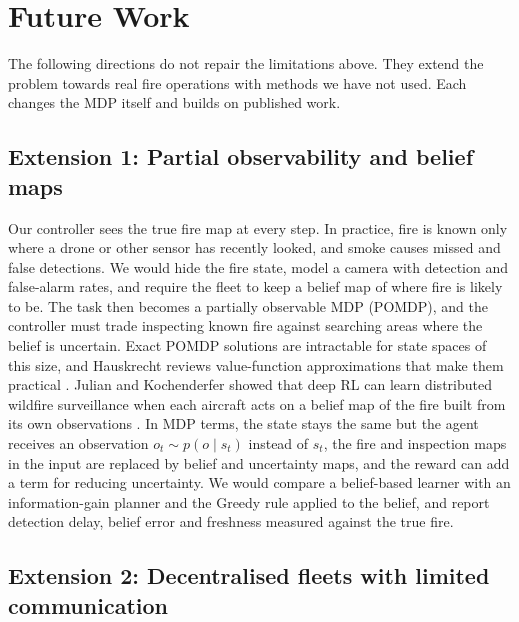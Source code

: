 \section{Future Work}
\label{sec:future}

The following directions do not repair the limitations above. They extend the problem towards
real fire operations with methods we have not used. Each changes the MDP itself and builds on
published work.

\subsection{Extension 1: Partial observability and belief maps}

Our controller sees the true fire map at every step. In practice, fire is known only where a
drone or other sensor has recently looked, and smoke causes missed and false detections. We
would hide the fire state, model a camera with detection and false-alarm rates, and require
the fleet to keep a belief map of where fire is likely to be. The task then becomes a
partially observable MDP (POMDP), and the controller must trade inspecting known fire against
searching areas where the belief is uncertain. Exact POMDP solutions are intractable for state
spaces of this size, and Hauskrecht reviews value-function approximations that make them
practical \cite{hauskrecht2000}. Julian and Kochenderfer showed that deep RL can learn
distributed wildfire surveillance when each aircraft acts on a belief map of the fire built
from its own observations \cite{julian2019}. In MDP terms, the state stays the same but the agent receives an
observation $o_t \sim p(o \mid s_t)$ instead of $s_t$, the fire and inspection maps in the
input are replaced by belief and uncertainty maps, and the reward can add a term for reducing
uncertainty. We would compare a belief-based learner with an information-gain planner
and the Greedy rule applied to the belief, and report detection delay, belief error and
freshness measured against the true fire.

\subsection{Extension 2: Decentralised fleets with limited communication}

